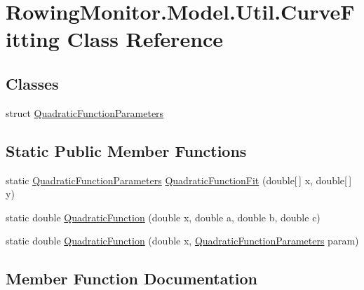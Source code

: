 \hypertarget{class_rowing_monitor_1_1_model_1_1_util_1_1_curve_fitting}{}\section{Rowing\+Monitor.\+Model.\+Util.\+Curve\+Fitting Class Reference}
\label{class_rowing_monitor_1_1_model_1_1_util_1_1_curve_fitting}
\subsection*{Classes}
\begin{DoxyCompactItemize}
\item 
struct \hyperlink{struct_rowing_monitor_1_1_model_1_1_util_1_1_curve_fitting_1_1_quadratic_function_parameters}{Quadratic\+Function\+Parameters}
\end{DoxyCompactItemize}
\subsection*{Static Public Member Functions}
\begin{DoxyCompactItemize}
\item 
static \hyperlink{struct_rowing_monitor_1_1_model_1_1_util_1_1_curve_fitting_1_1_quadratic_function_parameters}{Quadratic\+Function\+Parameters} \hyperlink{class_rowing_monitor_1_1_model_1_1_util_1_1_curve_fitting_aab35f1296fc2b02ad4709abce8b52cf9}{Quadratic\+Function\+Fit} (double\mbox{[}$\,$\mbox{]} x, double\mbox{[}$\,$\mbox{]} y)
\item 
static double \hyperlink{class_rowing_monitor_1_1_model_1_1_util_1_1_curve_fitting_a0ce417f32d1e09fcceba1578a5955f3a}{Quadratic\+Function} (double x, double a, double b, double c)
\item 
static double \hyperlink{class_rowing_monitor_1_1_model_1_1_util_1_1_curve_fitting_a21bd155270e8abd871e52e400a896df0}{Quadratic\+Function} (double x, \hyperlink{struct_rowing_monitor_1_1_model_1_1_util_1_1_curve_fitting_1_1_quadratic_function_parameters}{Quadratic\+Function\+Parameters} param)
\end{DoxyCompactItemize}


\subsection{Member Function Documentation}
\mbox{\label{class_rowing_monitor_1_1_model_1_1_util_1_1_curve_fitting_a0ce417f32d1e09fcceba1578a5955f3a}} 
